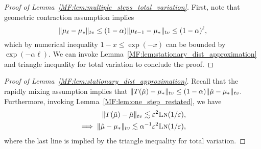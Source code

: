


\begin{proof}[Proof of Lemma~\ref{MF:lem:multiple_steps_total_variation}]
First, note that geometric contraction assumption implies
\begin{equation}
    \lVert\mu_{\ell}-\mu_{*}\rVert_{tv}\le (1-\alpha)\lVert\mu_{\ell-1}-\mu_{*}\rVert_{tv} \le (1-\alpha)^\ell,
\end{equation}
which by numerical inequality $1-x\le \exp(-x)$ can be bounded by $\exp(-\alpha \ell).$ We can invoke Lemma~\ref{MF:lem:stationary_dist_approximation} and triangle inequality for total variation to conclude the proof.
\end{proof}

\begin{proof}[Proof of Lemma~\ref{MF:lem:stationary_dist_approximation}] 
Recall that the rapidly mixing assumption implies that $\lVert T(\hat\mu)-\mu_*\rVert_{tv}\le (1-\alpha) \lVert\hat\mu-\mu_*\rVert_{tv}.$ Furthermore, invoking Lemma~\ref{MF:lem:one_step_restated}, we have 
\begin{align}
    \lVert T(\hat\mu)-\hat\mu\rVert_{tv}\lesssim {\varepsilon}^2\text{\sc{Ln}}(1/{\varepsilon}),\\
  \implies  \lVert\hat\mu-\mu_*\rVert_{tv}\lesssim \alpha^{-1} {\varepsilon}^2\text{\sc{Ln}}(1/{\varepsilon}),
\end{align}
where the last line is implied by the triangle inequality for total variation.
\end{proof}


